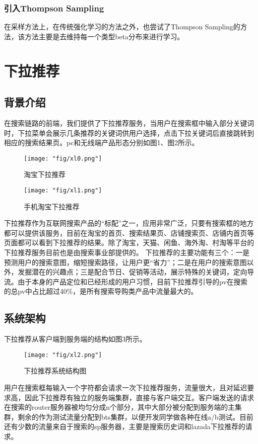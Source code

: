 \subsubsection{引入Thompson Sampling}
在采样方法上，在传统强化学习的方法之外，也尝试了Thompson Sampling的方法，该方法主要是去维持每一个类型beta分布来进行学习。

\section{下拉推荐}

\subsection{背景介绍}
在搜索链路的前端，我们提供了下拉推荐服务，当用户在搜索框中输入部分关键词时，下拉菜单会展示几条推荐的关键词供用户选择，点击下拉关键词后直接跳转到相应的搜索结果页。pc和无线端产品形态分别如图1、图2所示。
\begin{figure}[!h]
	\centering
	\texttt{[image: "fig/xl0.png"]}
	\caption{淘宝下拉推荐}
	\label{fig:xl0}
\end{figure}
\begin{figure}[!h]
	\centering
	\texttt{[image: "fig/xl1.png"]}
	\caption{手机淘宝下拉推荐}
	\label{fig:xl1}
\end{figure}

下拉推荐作为互联网搜索产品的“标配”之一，应用非常广泛，只要有搜索框的地方都可以提供该服务，目前在淘宝的首页、搜索结果页、店铺搜索页、店铺内首页等页面都可以看到下拉推荐的结果。除了淘宝，天猫、闲鱼、海外淘、村淘等平台的下拉推荐服务目前也是由搜索事业部提供的。
下拉推荐的主要功能有三个：一是预测用户的搜索意图，缩短搜索路径，让用户更“省力”；二是在用户的搜索意图以外，发掘潜在的兴趣点；三是配合节日、促销等活动，展示特殊的关键词，定向导流。由于本身的产品定位和已经形成的用户习惯，目前下拉推荐引导的pv在搜索的总pv中占比超过40\%，是所有搜索导购类产品中流量最大的。

\subsection{系统架构}
下拉推荐从客户端到服务端的结构如图3所示。
\begin{figure}[!h]
	\centering
	\texttt{[image: "fig/xl2.png"]}
	\caption{下拉推荐系统结构图}
	\label{fig:xl2}
\end{figure}
用户在搜索框每输入一个字符都会请求一次下拉推荐服务，流量很大，且对延迟要求高，因此下拉推荐有独立的服务端集群，直接与客户端交互。客户端发送的请求在搜索的router服务器被均匀分成n个部分，其中大部分被分配到服务端的主集群，剩余的作为测试流量分配到bts集群，以便开发同学做各种在线a/b测试。目前还有少数的流量来自于搜索的sp服务器，主要是搜索历史词和lazada下拉推荐的请求。

